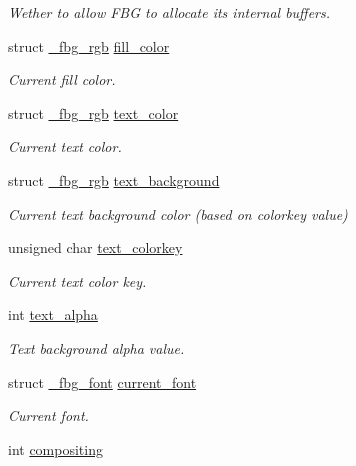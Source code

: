 \begin{DoxyCompactItemize}
\begin{DoxyCompactList}\small\item\em Wether to allow F\+BG to allocate its internal buffers. \end{DoxyCompactList}\item 
struct \hyperlink{fbgraphics_8h_struct__fbg__rgb}{\+\_\+fbg\+\_\+rgb} \hyperlink{struct__fbg_ad3cac82bd9448a4020a4e08621f5269a}{fill\+\_\+color}
\begin{DoxyCompactList}\small\item\em Current fill color. \end{DoxyCompactList}\item 
struct \hyperlink{fbgraphics_8h_struct__fbg__rgb}{\+\_\+fbg\+\_\+rgb} \hyperlink{struct__fbg_a4abb858439598b09790ec6d5d8326bb2}{text\+\_\+color}
\begin{DoxyCompactList}\small\item\em Current text color. \end{DoxyCompactList}\item 
struct \hyperlink{fbgraphics_8h_struct__fbg__rgb}{\+\_\+fbg\+\_\+rgb} \hyperlink{struct__fbg_afd34a8de5a853e915bd101f11d44cf67}{text\+\_\+background}
\begin{DoxyCompactList}\small\item\em Current text background color (based on colorkey value) \end{DoxyCompactList}\item 
unsigned char \hyperlink{struct__fbg_a06e65293cf0b48e70d76d63f5de453e6}{text\+\_\+colorkey}
\begin{DoxyCompactList}\small\item\em Current text color key. \end{DoxyCompactList}\item 
int \hyperlink{struct__fbg_a870987786121c51135f20b630d731abd}{text\+\_\+alpha}
\begin{DoxyCompactList}\small\item\em Text background alpha value. \end{DoxyCompactList}\item 
struct \hyperlink{fbgraphics_8h_struct__fbg__font}{\+\_\+fbg\+\_\+font} \hyperlink{struct__fbg_a72868d703236aaabb7a5031703a6bbd8}{current\+\_\+font}
\begin{DoxyCompactList}\small\item\em Current font. \end{DoxyCompactList}\item 
int \hyperlink{struct__fbg_a7090d672982fe465f2186dbfea384d32}{compositing}

\end{DoxyCompactItemize}
